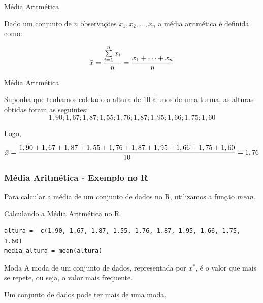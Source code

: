\begin{frame}{Média Aritmética}

Dado um conjunto de $n$ observações $x_1, x_2, \dots, x_n$ a média aritmética é definida como:

$$\Bar{x} = \dfrac{\sum\limits_{i=1}^n x_i}{n} = \dfrac{x_1 + \dots + x_n}{n}$$

\end{frame}

\begin{frame}{Média Aritmética}
\begin{exemplo}
    Suponha que tenhamos coletado a altura de $10$ alunos de uma turma, as alturas obtidas foram as seguintes:
    $$1,90; 1,67; 1,87; 1,55; 1,76; 1,87; 1,95; 1,66; 1,75; 1,60$$
\end{exemplo}

Logo, 

{\footnotesize $$\Bar{x} = \dfrac{1,90 + 1,67 + 1,87 + 1,55 + 1,76 + 1,87 + 1,95 + 1,66 + 1,75 + 1,60}{10} = 1,76$$}
\end{frame}

\begin{frame}[fragile]
\frametitle{Média Aritmética - Exemplo no R}    
Para calcular a média de um conjunto de dados no R, utilizamos a função \textit{mean}.
\begin{block}{Calculando a Média Aritmética no R}
\begin{verbatim}
altura =  c(1.90, 1.67, 1.87, 1.55, 1.76, 1.87, 1.95, 1.66, 1.75, 1.60)
media_altura = mean(altura)
\end{verbatim}
\end{block}
\end{frame}


\begin{frame}{Moda}
    A moda de um conjunto de dados, representada por $x^*$, é o valor que mais se repete, 
    ou seja, o valor mais frequente. 
    \pause

    \begin{atencao}
        Um conjunto de dados pode ter mais de uma moda.
    \end{atencao}
\end{frame}

